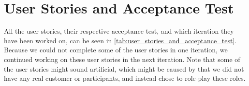 
\chapter{User Stories and Acceptance Test}
\label{app:user_stories_and_acceptance_test}

All the user stories, their respective acceptance test, and which iteration they have been worked on, can be seen in \ref{tab:user_stories_and_acceptance_test}. Because we could not complete some of the user stories in one iteration, we continued working on these user stories in the next iteration. Note that some of the user stories might sound artificial, which might be caused by that we did not have any real customer or participants, and instead chose to role-play these roles.

